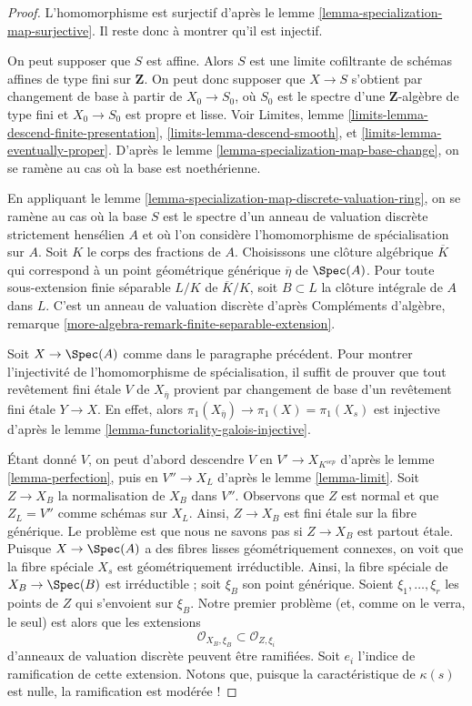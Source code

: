 \begin{proof}
L'homomorphisme est surjectif d'après le
lemme \ref{lemma-specialization-map-surjective}.
Il reste donc à montrer qu'il est injectif.

\medskip\noindent
On peut supposer que $S$ est affine. Alors $S$ est une limite cofiltrante de schémas
affines de type fini sur $\mathbf{Z}$.
On peut donc supposer que $X \to S$ s'obtient par
changement de base à partir de $X_0 \to S_0$, où $S_0$ est le spectre d'une
$\mathbf{Z}$-algèbre de type fini et $X_0 \to S_0$ est propre et lisse.
Voir Limites, lemme \ref{limits-lemma-descend-finite-presentation},
\ref{limits-lemma-descend-smooth}, et
\ref{limits-lemma-eventually-proper}. D'après le
lemme \ref{lemma-specialization-map-base-change},
on se ramène au cas où la base est noethérienne.

\medskip\noindent
En appliquant le lemme \ref{lemma-specialization-map-discrete-valuation-ring},
on se ramène au cas où la base $S$ est le spectre d'un
anneau de valuation discrète strictement hensélien $A$ et où l'on
considère l'homomorphisme de spécialisation sur $A$.
Soit $K$ le corps des fractions de $A$.
Choisissons une clôture algébrique $\overline{K}$ qui
correspond à un point géométrique générique $\overline{\eta}$ de $\Spec(A)$.
Pour toute sous-extension finie séparable $L/K$ de $\overline{K}/K$, soit $B \subset L$ la
clôture intégrale de $A$ dans $L$. C'est un anneau de
valuation discrète d'après
Compléments d'algèbre, remarque \ref{more-algebra-remark-finite-separable-extension}.

\medskip\noindent
Soit $X \to \Spec(A)$ comme dans le paragraphe précédent.
Pour montrer l'injectivité de l'homomorphisme de spécialisation,
il suffit de prouver que tout revêtement fini
\'etale $V$ de $X_{\overline{\eta}}$ provient par changement
de base d'un revêtement fini \'etale $Y \to X$.
En effet, alors $\pi_1(X_{\overline{\eta}}) \to \pi_1(X) = \pi_1(X_s)$
est injective d'après le lemme \ref{lemma-functoriality-galois-injective}.

\medskip\noindent
Étant donné $V$, on peut d'abord descendre $V$ en $V' \to X_{K^{sep}}$ d'après le
lemme \ref{lemma-perfection}, puis en
$V'' \to X_L$ d'après le lemme \ref{lemma-limit}.
Soit $Z \to X_B$ la normalisation de $X_B$ dans $V''$.
Observons que $Z$ est normal et que $Z_L = V''$ comme schémas
sur $X_L$. Ainsi, $Z \to X_B$ est fini \'etale sur
la fibre générique. Le problème est que nous ne savons pas si
$Z \to X_B$ est partout \'etale. Puisque $X \to \Spec(A)$
a des fibres lisses géométriquement connexes, on voit que
la fibre spéciale $X_s$ est géométriquement irréductible.
Ainsi, la fibre spéciale de $X_B \to \Spec(B)$ est irréductible ;
soit $\xi_B$ son point générique. Soient
$\xi_1, \ldots, \xi_r$ les points de $Z$ qui s'envoient sur
$\xi_B$. Notre premier problème (et, comme on le verra, le seul)
est alors que les extensions
$$
\mathcal{O}_{X_B, \xi_B} \subset \mathcal{O}_{Z, \xi_i}
$$
d'anneaux de valuation discrète peuvent être ramifiées. Soit $e_i$
l'indice de ramification de cette extension. Notons que, puisque la
caractéristique de $\kappa(s)$ est nulle, la ramification est modérée !


\end{proof}
